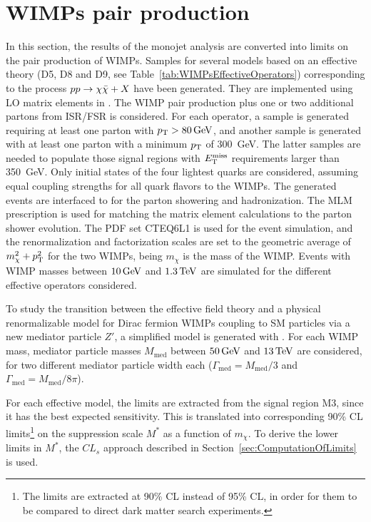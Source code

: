 \section{WIMPs pair production}
    \label{sec:WIMPsProduction}

In this section, the results of the monojet analysis are converted into limits on the pair production of WIMPs. 
Samples for several models based on an effective theory (D5, D8 and D9, see Table~\ref{tab:WIMPsEffectiveOperators}) corresponding to the process $pp \rightarrow \chi \bar{\chi} + X$ have been generated.
They are implemented using LO matrix elements in \madgraph{}.
The WIMP pair production plus one or two additional partons from ISR/FSR is considered.
For each operator, a sample is generated requiring at least one parton with $\pt>\unit[80]{GeV}$, and another sample is generated with at least one parton with a minimum $p_{\mathrm{T}}$ of 300~GeV.
The latter samples are needed to populate those signal regions with $E_{\mathrm{T}}^{\mathrm{miss}}$ requirements larger than 350~GeV.
Only initial states of the four lightest quarks are considered, assuming equal coupling strengths for all quark flavors to the WIMPs.
The generated events are interfaced to \pythia{} for the parton showering and hadronization.
The MLM prescription is used for matching the matrix element calculations to the parton shower evolution.
The PDF set CTEQ6L1 is used for the event simulation, and the renormalization and factorization scales are set to the geometric average of $m_{\chi}^2 + p_{\mathrm{T}}^2$ for the two WIMPs, being $m_{\chi}$ is the mass of the WIMP.
Events with WIMP masses between $\unit[10]{GeV}$ and $\unit[1.3]{TeV}$ are simulated for the different effective operators considered.

To study the transition between the effective field theory and a physical renormalizable model for Dirac fermion WIMPs coupling to SM particles via a new mediator particle $Z'$, a simplified model is generated with \madgraph{}.
For each WIMP mass, mediator particle masses $M_{\text{med}}$ between $\unit[50]{GeV}$ and $\unit[13]{TeV}$ are considered, for two different mediator particle width each ($\Gamma_{\text{med}} = M_{\text{med}}/3$ and $\Gamma_{\text{med}} = M_{\text{med}}/8\pi$).
  
For each effective model, the limits are extracted from the signal region M3, since it has the best expected sensitivity.
This is translated into corresponding 90\% CL limits\footnote{The limits are extracted at 90\% CL instead of 95\% CL, in order for them to be compared to direct dark matter search experiments.} on the suppression scale $M^{\ast}$ as a function of $m_{\chi}$.
To derive the lower limits in $M^{\ast}$, the $CL_s$ approach described in Section~\ref{sec:ComputationOfLimits} is used.
    
